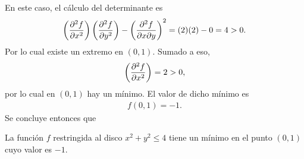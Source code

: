 \documentclass{fmbvecto}
\begin{document}
\begin{problema}[optimización]
    En este caso, el cálculo del determinante es
    \begin{align*}
        \left(\nparder{2}[f][x]\right)\left(\nparder{2}[f][y]\right) - \left(\frac{\partial^2 f}{\partial x \partial y}\right)^2 = (2)(2) - 0 = 4 > 0.
    \end{align*}
    Por lo cual existe un extremo en \((0, 1)\). Sumado a eso, 
    \begin{align*}
        \left(\nparder{2}[f][x]\right) = 2 > 0,
    \end{align*}
    por lo cual en \((0, 1)\) hay un mínimo. El valor de dicho mínimo es
    \begin{align*}
        f(0, 1) = -1.
    \end{align*}
    Se concluye entonces que
    \begin{gbox}
        La función \(f\) restringida al disco \(x^2+y^2\leq 4\) tiene un mínimo en el punto \((0, 1)\) cuyo valor es \(-1\).
    \end{gbox}


\end{problema}
\end{document}
